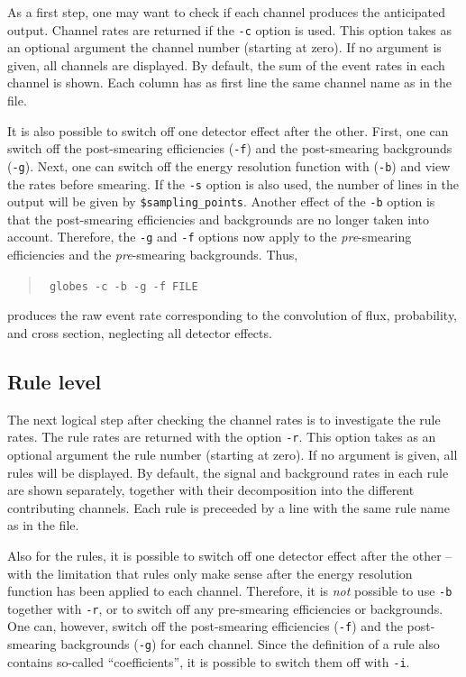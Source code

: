 As a first step, one may want to check if each channel produces the 
anticipated output. Channel rates are returned if the {\tt -c} option 
is used.
This option takes as an optional argument the channel number 
(starting at zero). If no argument is given, all channels are displayed.
By default, the sum of the event rates in each channel is shown. Each 
column has as first line the same channel name as in the file. 

It is also possible to switch off one detector effect after the other. 
First, one can switch off the post-smearing efficiencies ({\tt -f}) and the 
post-smearing backgrounds ({\tt -g}). Next, one can switch off the 
energy resolution function with ({\tt -b}) and view the rates before
smearing. If the {\tt -s} option is also used, the number of
lines in the output will be given by {\tt \$sampling\_points}.
Another effect of the {\tt -b} option is that the post-smearing efficiencies
and backgrounds are no longer taken into account. Therefore, the {\tt -g} 
and {\tt -f} options now apply to the \emph{pre}-smearing efficiencies 
and the \emph{pre}-smearing backgrounds. Thus, 
\begin{quote}
{\tt
globes -c -b -g -f FILE
}
\end{quote}
produces the raw event rate corresponding to the convolution of flux, 
probability, and cross section, neglecting all detector effects.

\subsection*{Rule level}

The next logical step after checking the channel rates is to investigate
 the rule rates. The rule rates are returned with the option {\tt -r}.
This option takes as an optional argument the rule number 
(starting at zero). If no argument is given, all rules will be displayed.
By default, the signal and background rates in each rule are shown
separately, together with their decomposition into the different
contributing channels. Each rule is preceeded by a line with the same
rule name as in the file. 

Also for the rules, it is possible to switch off one detector effect after 
the other -- with the limitation that rules only make sense
after the energy resolution function has been applied to each channel.
Therefore, it is \emph{not} possible to use {\tt -b} together with {\tt -r}, or to switch off any pre-smearing efficiencies or backgrounds. 
One can, however, switch off the post-smearing efficiencies ({\tt -f}) 
and the post-smearing backgrounds ({\tt -g}) for each channel. Since
the definition of a rule also contains so-called ``coefficients'', it is
possible to switch them off with {\tt -i}. 


